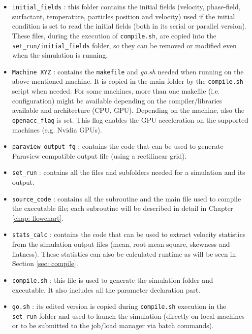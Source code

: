 \begin{itemize}
\item \texttt{initial\_fields} : this folder contains the initial fields (velocity, phase-field, surfactant, temperature, particles position and velocity) used if the initial condition is set to read the initial fields (both in its serial or parallel version). 
These files, during the execution of \texttt{compile.sh}, are copied into the \texttt{set\_run/initial\_fields} folder, so they can be removed or modified even when the simulation is running.
\item \texttt{Machine XYZ} : contains the \texttt{makefile} and \textit{go.sh} needed when running on the above mentioned machine. It is copied in the main folder by the \texttt{compile.sh} script when needed.
For some machines, more than one makefile (i.e. configuration) might be available depending on the compiler/libraries available and architecture (CPU, GPU).
Depending on the machine, also the \texttt{openacc\_flag} is set. 
This flag enables the GPU acceleration on the supported machines (e.g. Nvidia GPUs).
\item \texttt{paraview\_output\_fg} : contains the code that can be used to generate Paraview compatible output file (using a rectilinear grid).
\item \texttt{set\_run} : contains all the files and subfolders needed for a simulation and its output.
\item \texttt{source\_code} : contains all the subroutine and the main file used to compile the executable file; each subroutine will be described in detail in Chapter \ref{chap: flowchart}.
\item \texttt{stats\_calc} : contains the code that can be used to extract velocity statistics from the simulation output files (mean, root mean square, skewness and flatness). These statistics can also be calculated runtime as will be seen in Section \ref{sec: compile}.
\item \texttt{compile.sh} : this file is used to generate the simulation folder and executable. It also includes all the parameter declaration part.
\item \texttt{go.sh} : its edited version is copied during \texttt{compile.sh} execution in the \texttt{set\_run} folder and used to launch the simulation (directly on local machines or to be submitted to the job/load manager via batch commands).

\end{itemize}
